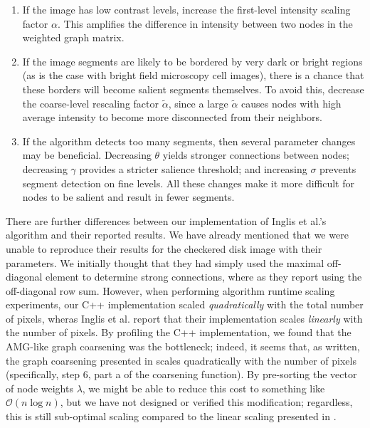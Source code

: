 \documentclass[12pt]{article}%
\begin{document}
\begin{enumerate}

\item If the image has low contrast levels, increase the first-level intensity scaling factor $\alpha$. This amplifies the difference in intensity between two nodes in the weighted graph matrix.

\item If the image segments are likely to be bordered by very dark or bright regions (as is the case with bright field microscopy cell images), there is a chance that these borders will become salient segments themselves. To avoid this, decrease the coarse-level rescaling factor $\tilde{\alpha}$, since a large $\tilde{\alpha}$ causes nodes with high average intensity to become more disconnected from their neighbors.

\item If the algorithm detects too many segments, then several parameter changes may be beneficial. Decreasing $\theta$ yields stronger connections between nodes; decreasing $\gamma$ provides a stricter salience threshold; and increasing $\sigma$ prevents segment detection on fine levels. All these changes make it more difficult for nodes to be salient and result in fewer segments.

\end{enumerate}

There are further differences between our implementation of Inglis et al.'s algorithm and their reported results.  We have already mentioned that we were unable to reproduce their results for the checkered disk image with their parameters.  We initially thought that they had simply used the maximal off-diagonal element to determine strong connections, where as they report using the off-diagonal row sum.  However, when performing algorithm runtime scaling experiments, our C++ implementation scaled \emph{quadratically} with the total number of pixels, wheras Inglis et al. report that their implementation scales \emph{linearly} with the number of pixels.  By profiling the C++ implementation, we found that the AMG-like graph coarsening was the bottleneck; indeed, it seems that, as written, the graph coarsening presented in \cite{inglis:2010} scales quadratically with the number of pixels (specifically, step 6, part a of the coarsening function).  By pre-sorting the vector of node weights $\lambda$, we might be able to reduce this cost to something like $\mathcal{O}(n\log n)$, but we have not designed or verified this modification; regardless, this is still sub-optimal scaling compared to the linear scaling presented in \cite{inglis:2010}.\\
\end{document}
